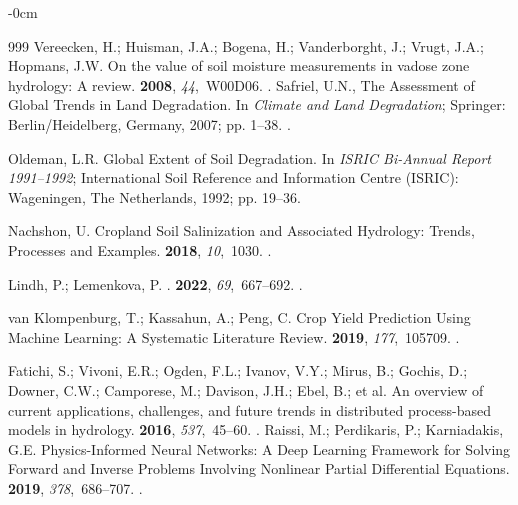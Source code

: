 \documentclass[land,review,accept,pdftex,oneauthor]{Definitions/mdpi}
\begin{document}
\begin{adjustwidth}{-\extralength}{0cm}
\begin{thebibliography}{999}
Vereecken, H.; Huisman, J.A.; Bogena, H.; Vanderborght, J.; Vrugt, J.A.; Hopmans, J.W.
\newblock On the value of soil moisture measurements in vadose zone hydrology: A review.
 {\bf 2008}, {\em 44},~W00D06.
.
Safriel, U.N., The Assessment of Global Trends in Land Degradation.
\newblock In {\em Climate and Land Degradation}; Springer:
  Berlin/Heidelberg, Germany, 2007; pp. 1--38.
.

Oldeman, L.R.
\newblock Global Extent of Soil Degradation. In {\em ISRIC Bi-Annual Report
  1991--1992}; International Soil Reference and Information Centre (ISRIC):
  Wageningen, The Netherlands,  1992; pp. 19--36.

Nachshon, U.
\newblock Cropland Soil Salinization and Associated Hydrology: Trends,
  Processes and Examples.
 {\bf 2018}, {\em 10},~1030.
.

Lindh, P.; Lemenkova, P.
.
 {\bf 2022}, {\em
  69},~667--692.
.

van Klompenburg, T.; Kassahun, A.; Peng, C.
\newblock Crop Yield Prediction Using Machine Learning: A Systematic Literature
  Review.
 {\bf 2019}, {\em
  177},~105709.
.

Fatichi, S.; Vivoni, E.R.; Ogden, F.L.; Ivanov, V.Y.; Mirus, B.; Gochis, D.; Downer, C.W.; Camporese, M.; Davison, J.H.; Ebel, B.; et al.
\newblock An overview of current applications, challenges, and future trends in distributed process-based models in hydrology.
 {\bf 2016}, {\em 537},~45--60.
.
Raissi, M.; Perdikaris, P.; Karniadakis, G.E.
\newblock Physics-Informed Neural Networks: A Deep Learning Framework for
  Solving Forward and Inverse Problems Involving Nonlinear Partial Differential
  Equations.
 {\bf 2019}, {\em
  378},~686--707.
.


\end{thebibliography}
\end{adjustwidth}
\end{document}
